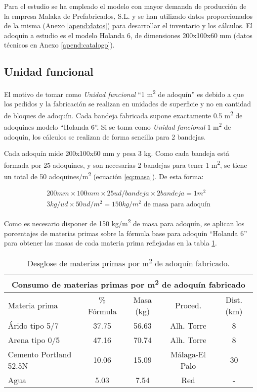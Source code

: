 Para el estudio se ha empleado el modelo con mayor demanda de producción de la empresa Malaka de Prefabricados, S.L. y se han utilizado datos proporcionados de la misma (Anexo \ref{apend:datos}) para desarrollar el inventario y los cálculos. El adoquín a estudio es el modelo Holanda 6, de dimensiones 200x100x60 \si{mm} (datos técnicos en Anexo \ref{apend:catalogo}).


\subsection{Unidad funcional}

El motivo de tomar como \textit{Unidad funcional} ``1 \si{m^2} de adoquín'' es debido a que los pedidos y la fabricación se realizan en unidades de superficie y no en cantidad de bloques de adoquín. Cada bandeja fabricada supone exactamente 0.5 \si{m^2} de adoquines modelo ``Holanda 6''. Si se toma como \textit{Unidad funcional} 1 \si{m^2} de adoquín, los cálculos se realizan de forma sencilla para 2 bandejas.

Cada adoquín mide 200x100x60 \si{mm} y pesa 3 \si{kg}. Como cada bandeja está formada por 25 adoquines, y son necesarias 2 bandejas para tener 1 \si{m^2}, se tiene un total de 50 adoquines/\si{m^2} (ecuación \ref{eq:masa}). De esta forma:

\begin{gather}
200 mm \times 100 mm \times 25 ud/bandeja \times 2 bandeja = 1 m^2\\
3 kg/ud \times 50 ud/m^2 = 150 kg/m^2 \text{ de masa para adoquín}\label{eq:masa}
\end{gather}

Como es necesario disponer de 150 \si{kg/m^2} de masa para adoquín, se aplican los porcentajes de materias primas sobre la fórmula base para adoquín ``Holanda 6'' para obtener las masas de cada materia prima reflejadas en la tabla \ref{desglosemateriasprimas}.

\begin{table}[!htb]
\centering
\begin{tabular}{lcccc}
\toprule
\multicolumn{5}{c}{Consumo de materias primas por \si{m^2} de adoquín fabricado}\\
\midrule
Materia prima & \% Fórmula & Masa (\si{kg}) & Proced. & Dist. (\si{km})\\
\midrule
Árido tipo 5/7 & 37.75 & 56.63 & Alh. Torre & 8\\
Arena tipo 0/5 & 47.16 & 70.74 & Alh. Torre & 8\\
Cemento Portland 52.5N & 10.06 & 15.09 & Málaga-El Palo & 30\\
Agua & 5.03 & 7.54 & Red & -\\
\bottomrule
\end{tabular}
\caption{Desglose de materias primas por \si{m^2} de adoquín fabricado.}
\label{desglosemateriasprimas}
\end{table}

